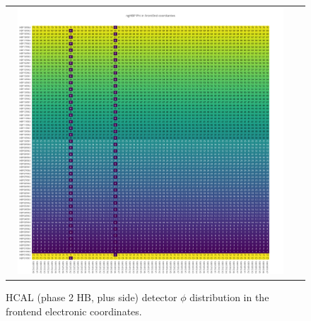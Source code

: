 \begin{figure}[htb]
 \begin{center}
  \begin{tabular}{cc}
   \includegraphics[angle=0,width=0.95\textwidth]{figures/appendix/ngHBP_Phi_in_FrontEnd.png}
  \end{tabular}
	\caption{HCAL (phase 2 HB, plus side) detector $\phi$ distribution in the frontend electronic coordinates.}
  \label{fig:lmapngHBPPhiFEC}
 \end{center}
\end{figure}
\clearpage

